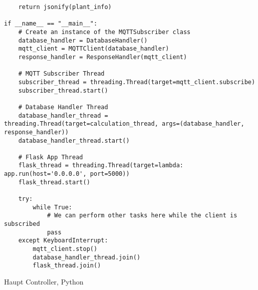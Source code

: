 \begin{longlisting}
\begin{verbatim}
    return jsonify(plant_info)

if __name__ == "__main__":
    # Create an instance of the MQTTSubscriber class
    database_handler = DatabaseHandler()
    mqtt_client = MQTTClient(database_handler)
    response_handler = ResponseHandler(mqtt_client)

    # MQTT Subscriber Thread
    subscriber_thread = threading.Thread(target=mqtt_client.subscribe)
    subscriber_thread.start()

    # Database Handler Thread
    database_handler_thread = threading.Thread(target=calculation_thread, args=(database_handler, response_handler))
    database_handler_thread.start()

    # Flask App Thread
    flask_thread = threading.Thread(target=lambda: app.run(host='0.0.0.0', port=5000))
    flask_thread.start()

    try:
        while True:
            # We can perform other tasks here while the client is subscribed
            pass
    except KeyboardInterrupt:
        mqtt_client.stop()
        database_handler_thread.join()
        flask_thread.join()

\end{verbatim}
\caption{Haupt Controller, Python}\label{cde:applicationService}
\end{longlisting}
\newpage

